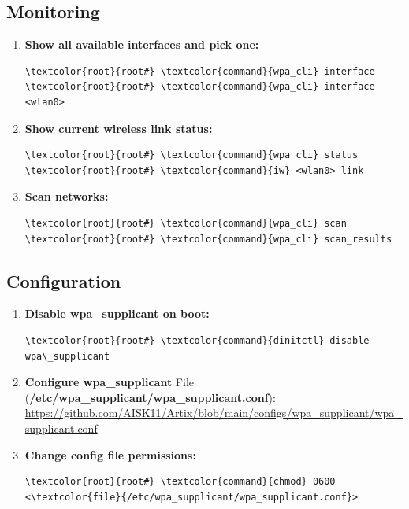 \documentclass[10pt, a4paper, onecolumn, oneside, titlepage, openany]{book}
\begin{document}
\subsection{Monitoring}
\begin{enumerate}
    \item \textbf{Show all available interfaces and pick one:}
\begin{Verbatim}[commandchars=\\\{\}]
\textcolor{root}{root#} \textcolor{command}{wpa_cli} interface
\textcolor{root}{root#} \textcolor{command}{wpa_cli} interface <wlan0>
\end{Verbatim}
    \item \textbf{Show current wireless link status:}
\begin{Verbatim}[commandchars=\\\{\}]
\textcolor{root}{root#} \textcolor{command}{wpa_cli} status
\textcolor{root}{root#} \textcolor{command}{iw} <wlan0> link
\end{Verbatim}
    \item \textbf{Scan networks:}
\begin{Verbatim}[commandchars=\\\{\}]
\textcolor{root}{root#} \textcolor{command}{wpa_cli} scan
\textcolor{root}{root#} \textcolor{command}{wpa_cli} scan_results
\end{Verbatim}
\end{enumerate}
\subsection{Configuration}
\begin{enumerate}
    \item \textbf{Disable wpa\_supplicant on boot:}
\begin{Verbatim}[commandchars=\\\{\}]
\textcolor{root}{root#} \textcolor{command}{dinitctl} disable wpa\_supplicant
\end{Verbatim}
    \item \textbf{Configure wpa\_supplicant}
\newline File (\textbf{\textcolor{file}{/etc/wpa\_supplicant/wpa\_supplicant.conf}}):
\newline \url{https://github.com/AISK11/Artix/blob/main/configs/wpa_supplicant/wpa_supplicant.conf}
    \item \textbf{Change config file permissions:}
\begin{Verbatim}[commandchars=\\\{\}]
\textcolor{root}{root#} \textcolor{command}{chmod} 0600 <\textcolor{file}{/etc/wpa_supplicant/wpa_supplicant.conf}>
\end{Verbatim}
\end{enumerate}
\end{document}
